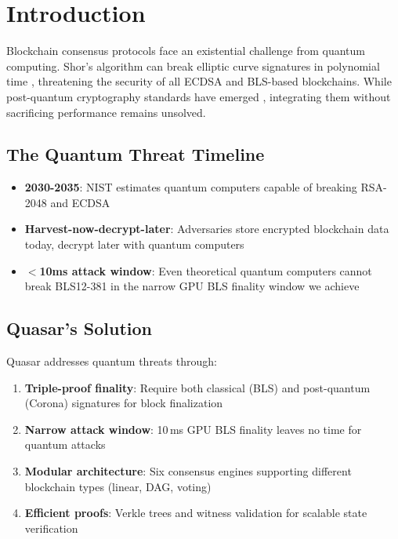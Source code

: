 \section{Introduction}


Blockchain consensus protocols face an existential challenge from quantum computing. Shor's algorithm can break elliptic curve signatures in polynomial time \cite{shor1994}, threatening the security of all ECDSA and BLS-based blockchains. While post-quantum cryptography standards have emerged \cite{nist-pqc}, integrating them without sacrificing performance remains unsolved.

\subsection{The Quantum Threat Timeline}

\begin{itemize}
\item \textbf{2030-2035}: NIST estimates quantum computers capable of breaking RSA-2048 and ECDSA \cite{mosca2018}
\item \textbf{Harvest-now-decrypt-later}: Adversaries store encrypted blockchain data today, decrypt later with quantum computers
\item \textbf{$<$10ms attack window}: Even theoretical quantum computers cannot break BLS12-381 in the narrow GPU BLS finality window we achieve
\end{itemize}

\subsection{Quasar's Solution}

Quasar addresses quantum threats through:
\begin{enumerate}
\item \textbf{Triple-proof finality}: Require both classical (BLS) and post-quantum (Corona) signatures for block finalization
\item \textbf{Narrow attack window}: 10\,ms GPU BLS finality leaves no time for quantum attacks
\item \textbf{Modular architecture}: Six consensus engines supporting different blockchain types (linear, DAG, voting)
\item \textbf{Efficient proofs}: Verkle trees and witness validation for scalable state verification
\end{enumerate}

